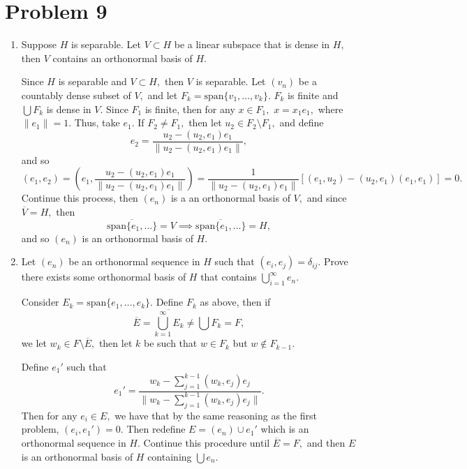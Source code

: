 \documentclass[11pt]{article}
\begin{document}
\section*{Problem 9}
\begin{problem}
\begin{enumerate}
    \item Suppose $H$ is separable. Let $V\subset H$ be a linear subspace that is dense in $H,$ then $V$ contains an orthonormal basis of $H.$
    \begin{solution}
        Since $H$ is separable and $V\subset H,$ then $V$ is separable. Let $(v_n)$ be a countably dense subset of $V,$ and let $F_k = \text{span}\{v_1, \dots, v_k\}.$ $F_k$ is finite and $\bigcup F_k$ is dense in $V.$ Since $F_1$ is finite, then for any $x\in F_1,$ $x = x_1 e_1,$ where $\|e_1\| = 1.$ Thus, take $e_1.$ If $F_2 \neq F_1,$ then let 
        $u_2 \in F_2 \setminus F_1,$ and define 
        \[e_2 = \frac{u_2 - (u_2, e_1)e_1}{\|u_2 - (u_2, e_1)e_1\|},\] and so 
        \[(e_1, e_2) = (e_1, \frac{u_2 - (u_2, e_1)e_1}{\|u_2 - (u_2, e_1)e_1\|}) = \frac{1}{\|u_2 - (u_2, e_1)e_1\|}[(e_1, u_2) - (u_2, e_1)(e_1, e_1)] = 0.\] Continue this process, then $(e_n)$ is a an orthonormal basis of $V,$ and since $\overline{V} = H,$ then
        \[\overline{\text{span}\{e_1, \dots\}} = V \implies \overline{\text{span}\{e_1, \dots\}} = H,\] and so $(e_n)$ is an orthonormal basis of $H.$
    \end{solution}
    \item Let $(e_n)$ be an orthonormal sequence in $H$ such that $(e_i, e_j)= \delta_{ij}.$ Prove there exists some orthonormal basis of $H$ that contains $\bigcup_{i=1}^\infty e_n.$
    \begin{solution}
        Consider $E_k = \text{span}\{e_1, \dots, e_k\}.$ Define $F_k$ as above, then if
        \[\overline{E} = \overline{\bigcup_{k=1}^\infty E_k} \neq \bigcup F_k = F,\] we let $w_k \in F\setminus \overline{E},$ then let $k$ be such that $w\in F_k$ but $w\notin F_{k-1}.$
        
        Define $e_1'$ such that \[e_1' = \frac{w_k - \sum_{j=1}^{k-1}(w_k, e_j)e_j}{\|w_k - \sum_{j=1}^{k-1}(w_k, e_j)e_j\|}.\] Then for any $e_i \in E,$ we have that by the same reasoning as the first problem, $(e_i, e_1')=0.$ Then redefine $E =(e_n)\cup e_1'$ which is an orthonormal sequence in $H.$ Continue this procedure until $\overline{E} = F,$ and then $E$ is an orthonormal basis of $H$ containing $\bigcup e_n.$
    \end{solution}
\end{enumerate}
    
    
\end{problem}
\end{document}
